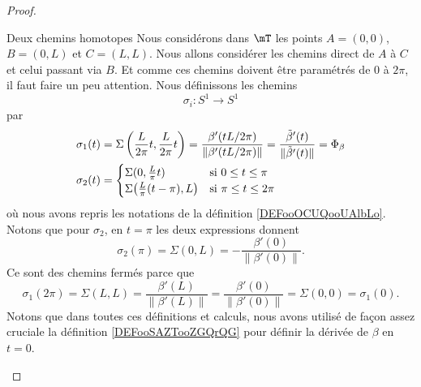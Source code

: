 \begin{proof}
\begin{subproof}
    \item[Deux chemins homotopes]
            Nous considérons dans \( \mT\) les points \( A=(0,0)\), \( B=(0,L)\) et \( C=(L,L)\). Nous allons considérer les chemins direct de \( A\) à \( C\) et celui passant via \( B\). Et comme ces chemins doivent être paramétrés de \( 0\) à \( 2 \pi\), il faut faire un peu attention. Nous définissons les chemins 
            \begin{equation}
                \sigma_i\colon S^1\to S^1
            \end{equation}
            par
            \begin{subequations}
                \begin{align}
                    \sigma_1(t)&=\Sigma\left( \frac{ L }{ 2\pi }t,\frac{ L }{ 2\pi }t \right)=\frac{ \beta'(tL/2\pi) }{ \| \beta'(tL/2\pi) \| }=\frac{ \tilde \beta'(t) }{ \|\tilde  \beta'(t) \| }=\Phi_{\beta}\\
                    \sigma_2(t)&=\begin{cases}
                        \Sigma(0,\frac{ L }{ \pi }t)    &   \text{si \( 0\leq t\leq \pi\)}\\
                        \Sigma\big( \frac{ L }{ \pi }(t-\pi),L  \big)    &    \text{si \(\pi\leq t\leq 2\pi\)}
                    \end{cases}
                \end{align}
            \end{subequations}
            où nous avons repris les notations de la définition \ref{DEFooOCUQooUAlbLo}. Notons que pour \( \sigma_2\), en \( t=\pi\) les deux expressions donnent
            \begin{equation}
                \sigma_2(\pi)=\Sigma(0,L)=-\frac{ \beta'(0) }{ \| \beta'(0) \| }.
            \end{equation}
            Ce sont des chemins fermés parce que
            \begin{equation}
                \sigma_1(2\pi)=\Sigma(L,L)=\frac{ \beta'(L) }{ \| \beta'(L) \| }=\frac{ \beta'(0) }{ \| \beta'(0) \| }=\Sigma(0,0)=\sigma_1(0).
            \end{equation}
            Notons que dans toutes ces définitions et calculs, nous avons utilisé de façon assez cruciale la définition \ref{DEFooSAZTooZGQrQG} pour définir la dérivée de \( \beta\) en \( t=0\).


\end{subproof}
\end{proof}
